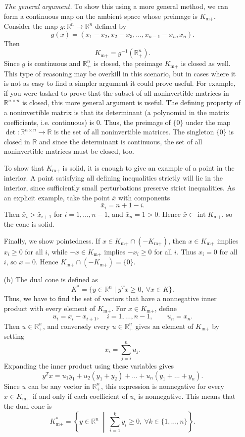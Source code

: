 \begin{enumerate}
\textit{The general argument.} To show this using a more general method, we can form a continuous map on the ambient space whose preimage is $K_{\text{m}+}$.
Consider the map $g: \mathbb{R}^n \to \mathbb{R}^{n}$ defined by
\[
    g(x) = (x_1 - x_2, x_2 - x_3, \dots, x_{n-1} - x_n, x_n).
\]
Then
\[
    K_{\text{m}+} = g^{-1}(\mathbb{R}^n_+).
\]
Since $g$ is continuous and $\mathbb{R}^n_+$ is closed, the preimage $K_{\text{m}+}$ is closed as well.
This type of reasoning may be overkill in this scenario, but in cases where it is not as easy to find a simpler argument it could prove useful.
For example, if you were tasked to prove that the subset of all noninvertible matrices in $\mathbb{R}^{n \times n}$ is closed, this more general argument is useful.
The defining property of a noninvertible matrix is that its determinant (a polynomial in the matrix coefficients, i.e. continuous) is 0.
Thus, the preimage of $\{0\}$ under the map $\operatorname{det}: \mathbb{R}^{n \times n} \to \mathbb{R}$ is the set of all noninvertible matrices.
The singleton $\{0\}$ is closed in $\mathbb{R}$ and since the determinant is continuous, the set of all noninvertible matrices must be closed, too.

To show that $K_{\text{m}+}$ is solid, it is enough to give an example of a point in the interior.
A point satisfying all defining inequalities strictly will lie in the interior, since sufficiently small perturbations preserve strict inequalities.
As an explicit example, take the point $\bar{x}$ with components
\[
    \bar{x}_i = n + 1 - i.
\]
Then $\bar{x}_i > \bar{x}_{i + 1}$ for $i = 1,\dots,n-1$, and $\bar{x}_n = 1 > 0$.
Hence $\bar{x} \in \operatorname{int} K_{\text{m}+}$, so the cone is solid.

Finally, we show pointedness.
If $x \in K_{\text{m}+} \cap (-K_{\text{m}+})$, then $x \in K_{\text{m}+}$ implies $x_i \geq 0$ for all $i$, while $-x \in K_{\text{m}+}$ implies $-x_i \geq 0$ for all $i$.
Thus $x_i = 0$ for all $i$, so $x = 0$.
Hence $K_{\text{m}+} \cap (-K_{\text{m}+}) = \{0\}$.

\item[(b)] The dual cone is defined as
\[
    K^* = \{y \in \mathbb{R}^n \mid y^T x \geq 0, \> \forall x \in K\}.
\]
Thus, we have to find the set of vectors that have a nonnegative inner product with every element of $K_{\text{m}+}$.
For $x \in K_{\text{m}+}$, define
\[
    u_i = x_i - x_{i+1}, \quad i = 1,\dots,n-1,
    \qquad
    u_n = x_n.
\]
Then $u \in \mathbb{R}^n_+$, and conversely every $u \in \mathbb{R}^n_+$ gives an element of $K_{\text{m}+}$ by setting
\[
    x_i = \sum_{j=i}^n u_j.
\]
Expanding the inner product using these variables gives
\[
    y^T x
    =
    u_1 y_1
    + u_2(y_1 + y_2)
    + \dots
    + u_n(y_1 + \dots + y_n).
\]
Since $u$ can be any vector in $\mathbb{R}^n_+$, this expression is nonnegative for every $x \in K_{\text{m}+}$ if and only if each coefficient of $u_i$ is nonnegative.
This means that the dual cone is
\[
    K_{\text{m}+}^* = \left\{y \in \mathbb{R}^n \; \middle|\; \sum_{i = 1}^k y_i \geq 0, \> \forall k \in \{1, \dots, n\}\right\}.
\]
\end{enumerate}
